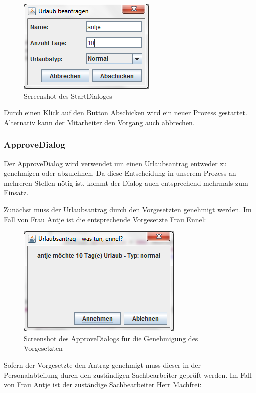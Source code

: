 \begin{figure}[H]
	\centering
	\includegraphics[width=0.4\linewidth]{Bilder/DialogUrlaubBeantragen}
	\caption{Screenshot des StartDialoges}
	\label{fig:DialogUrlaubBeantragen}
\end{figure}

Durch einen Klick auf den Button Abschicken wird ein neuer Prozess gestartet. Alternativ kann der Mitarbeiter den Vorgang auch abbrechen.

\subsubsection{ApproveDialog}
Der ApproveDialog wird verwendet um einen Urlaubsantrag entweder zu genehmigen oder abzulehnen. Da diese Entscheidung in unserem Prozess an mehreren Stellen nötig ist, kommt der Dialog auch entsprechend mehrmals zum Einsatz.

Zunächst muss der Urlaubsantrag durch den Vorgesetzten genehmigt werden. Im Fall von Frau Antje ist die entsprechende Vorgesetzte Frau Ennel:

\begin{figure}[H]
	\centering
	\includegraphics[width=0.5\linewidth]{Bilder/DialogVorgesetzteGenehmigung}
	\caption{Screenshot des ApproveDialogs für die Genehmigung des Vorgesetzten}
	\label{fig:DialogVorgesetzteGenehmigung}
\end{figure}

Sofern der Vorgesetzte den Antrag genehmigt muss dieser in der Personalabteilung durch den zuständigen Sachbearbeiter geprüft werden. Im Fall von Frau Antje ist der zuständige Sachbearbeiter Herr Machfrei:

